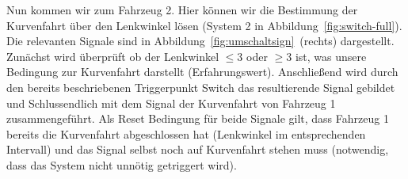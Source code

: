 Nun kommen wir zum Fahrzeug 2. Hier können wir die Bestimmung der Kurvenfahrt
über den Lenkwinkel lösen (System 2 in Abbildung~\ref{fig:switch-full}). Die
relevanten Signale sind in Abbildung~\ref{fig:umschaltsign}~(rechts)
dargestellt. Zunächst wird überprüft ob der Lenkwinkel $\leq 3$ oder $\geq 3$
ist, was unsere Bedingung zur Kurvenfahrt darstellt (Erfahrungswert).
Anschließend wird durch den bereits beschriebenen Triggerpunkt Switch das
resultierende Signal gebildet und Schlussendlich mit dem Signal der Kurvenfahrt
von Fahrzeug 1 zusammengeführt. Als Reset Bedingung für beide Signale gilt, dass
Fahrzeug 1 bereits die Kurvenfahrt abgeschlossen hat (Lenkwinkel im
entsprechenden Intervall) und das Signal selbst noch auf Kurvenfahrt stehen muss
(notwendig, dass das System nicht unnötig getriggert wird).

